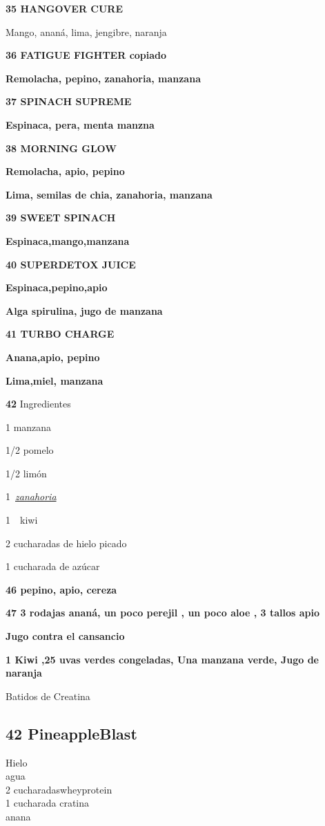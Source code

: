 \textbf{35 HANGOVER CURE}

Mango, ananá, lima, jengibre, naranja

\textbf{36 FATIGUE FIGHTER copiado}

\textbf{Remolacha, pepino, zanahoria, manzana}

\textbf{37 SPINACH SUPREME}

\textbf{Espinaca, pera, menta manzna}

\textbf{38 MORNING GLOW}

\textbf{Remolacha, apio, pepino}

\textbf{Lima, semilas de chia, zanahoria, manzana }

\textbf{39 SWEET SPINACH}

\textbf{Espinaca,mango,manzana}

\textbf{40 SUPERDETOX JUICE}

\textbf{Espinaca,pepino,apio }

\textbf{Alga spirulina, jugo de manzana}

\textbf{41 TURBO CHARGE}

\textbf{Anana,apio, pepino}

\textbf{Lima,miel, manzana }

\textbf{42} Ingredientes

1 manzana

1/2 pomelo

1/2 limón

1~\href{http://www.jugos-curativos.com/zanahorias.html}{\emph{zanahoria}}

1~~kiwi

2 cucharadas de hielo picado

1 cucharada de azúcar

\textbf{46 pepino, apio, cereza}

\textbf{47 3 rodajas ananá, un poco perejil , un poco aloe , 3 tallos
apio}

\textbf{Jugo contra el cansancio }

\textbf{1 Kiwi ,25 uvas verdes congeladas, Una manzana verde, Jugo de
naranja }

Batidos de Creatina

\subsection{\texorpdfstring{\textbf{42
PineappleBlast}}{42 PineappleBlast}}\label{pineappleblast}

Hielo\\
agua\\
2 cucharadaswheyprotein\\
1 cucharada cratina\\
anana


